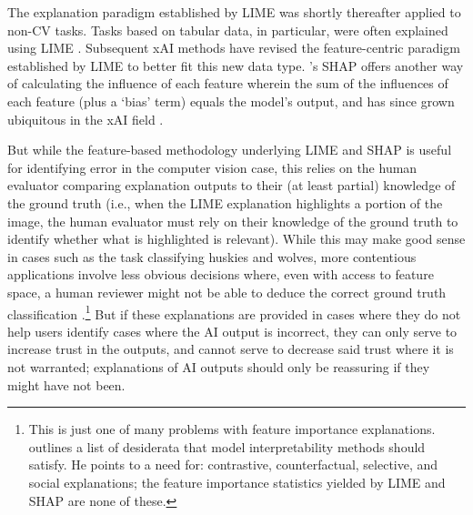 The explanation paradigm established by LIME was shortly thereafter applied to non-CV tasks. Tasks based on tabular data, in particular, were often explained using LIME \cite{zerilli_explaining_2020}. Subsequent xAI methods have revised the feature-centric paradigm established by LIME to better fit this new data type. \textcite{lundberg_unified_2017}'s SHAP offers another way of calculating the influence of each feature wherein the sum of the influences of each feature (plus a `bias' term) equals the model's output, and has since grown ubiquitous in the xAI field \cite{weerts_human-grounded_2019}.

But while the feature-based methodology underlying LIME and SHAP is useful for identifying error in the computer vision case, this relies on the human evaluator comparing explanation outputs to their (at least partial) knowledge of the ground truth (i.e., when the LIME explanation highlights a portion of the image, the human evaluator must rely on their knowledge of the ground truth to identify whether what is highlighted is relevant). While this may make good sense in cases such as the task classifying huskies and wolves, more contentious applications involve less obvious decisions where, even with access to feature space, a human reviewer might not be able to deduce the correct ground truth classification \cite{kumar_problems_2020,markus_role_2021}.\footnote{This is just one of many problems with feature importance explanations. \textcite{miller_explanation_2017} outlines a list of desiderata that model interpretability methods should satisfy. He points to a need for: contrastive, counterfactual, selective, and social explanations; the feature importance statistics yielded by LIME and SHAP are none of these.} But if these explanations are provided in cases where they do not help users identify cases where the AI output is incorrect, they can only serve to increase trust in the outputs, and cannot serve to decrease said trust where it is not warranted; explanations of AI outputs should only be reassuring if they might have not been.

